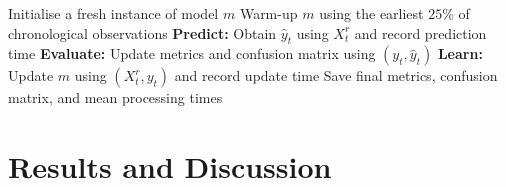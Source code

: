\documentclass[11pt,a4paper]{article}
\newcommand{\CityA}{Lisboa}
\newcommand{\CityB}{Porto}
\newif\ifdraftinstructions
\newcommand{\instruction}[1]{%
	\ifdraftinstructions
	\begin{instructionbox}[title=What to write here]
		\small\color{SecondaryText}#1
	\end{instructionbox}
	\fi
}
\begin{document}
	\begin{algorithm}[H]
		\caption{Prequential evaluation protocol used in the \texttt{ExperimentResults.run()} function in \texttt{src/results.py}}
		\label{alg:prequential-evaluation-protocol}
		\begin{algorithmic}[1]
			\ForAll{cities $c \in \{\text{\CityA}, \text{\CityB}\}$}
						\State Initialise a fresh instance of model $m$
						\State Warm-up $m$ using the earliest $25\%$ of chronological observations
							\State \textbf{Predict:} Obtain $\hat{y}_t$ using $X_t^r$ and record prediction time
							\State \textbf{Evaluate:} Update metrics and confusion matrix using $(y_t, \hat{y}_t)$
							\State \textbf{Learn:} Update $m$ using $(X^r_t, y_t)$ and record update time
						\EndFor
						\State Save final metrics, confusion matrix, and mean processing times
					\EndFor
				\EndFor
			\EndFor
		\end{algorithmic}
	\end{algorithm}
	
	
	\section{Results and Discussion}
	\instruction{Present only the evidence needed to answer the assignment. Interpret results rather than ranking models. Discuss class imbalance, event detection, differences between Representation A and Representation B, model behaviour over time, and computational cost. Connect model evidence back to the stream characteristics identified earlier. At least two analyses or visualisations in the complete report must be original group-designed analyses rather than direct reproductions of the starter-code figures. Suggested length: one to one-and-a-half pages.}
	
\end{document}
